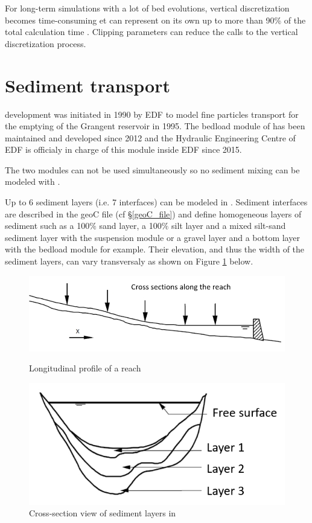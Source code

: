 For long-term simulations with a lot of bed evolutions, vertical discretization becomes time-consuming et can represent on its own up to more than 90\% of the total calculation time \cite{thesis_ung}. Clipping parameters can reduce the calls to the vertical discretization process. 

\section{Sediment transport}
\label{sediment_transport_th}
\courlis development was initiated in 1990 by EDF to model fine particles transport for the emptying of the Grangent reservoir in 1995. The bedload module of \courlis has been maintained and developed since 2012 and the Hydraulic Engineering Centre of EDF is officialy in charge of this module inside EDF since 2015.

The two modules can not be used simultaneously so no sediment mixing can be modeled with \courlis.

Up to 6 sediment layers (i.e. 7 interfaces) can be modeled in \courlis. Sediment interfaces are described in the geoC file (cf \S \ref{geoC_file}) and define homogeneous layers of sediment such as a 100$\%$ sand layer, a 100$\%$ silt layer and a mixed silt-sand sediment layer with the suspension module or a gravel layer and a bottom layer with the bedload module for example. Their elevation, and thus the width of the sediment layers, can vary transversaly as shown on Figure \ref{fig:layers} below.

\begin{figure}[htb!]
   \begin{minipage}[c]{.48\linewidth}
	\includegraphics[width=\textwidth]{./graphics/Plong.png} 
	\caption{Longitudinal profile of a reach}
	\label{fig:PLong}
   \end{minipage} \hfill
   \begin{minipage}[c]{.48\linewidth}
	\includegraphics[width=\textwidth]{./graphics/layers.png} 
	\caption{Cross-section view of sediment layers in \courlis}
	\label{fig:layers}
   \end{minipage}
\end{figure}

